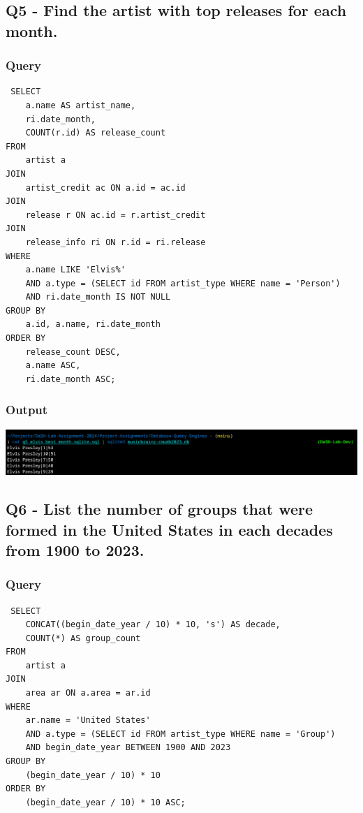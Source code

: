 \documentclass[11pt]{article}
\begin{document}
\subsection{Q5 - Find the artist with top releases for each month.}
\label{sec:org874fa3d}
\subsubsection{Query}
\label{sec:org431c081}
\begin{verbatim}
 SELECT
    a.name AS artist_name,
    ri.date_month,
    COUNT(r.id) AS release_count
FROM
    artist a
JOIN
    artist_credit ac ON a.id = ac.id
JOIN
    release r ON ac.id = r.artist_credit
JOIN
    release_info ri ON r.id = ri.release
WHERE
    a.name LIKE 'Elvis%'
    AND a.type = (SELECT id FROM artist_type WHERE name = 'Person')
    AND ri.date_month IS NOT NULL
GROUP BY
    a.id, a.name, ri.date_month
ORDER BY
    release_count DESC,
    a.name ASC,
    ri.date_month ASC;
\end{verbatim}
\subsubsection{Output}
\label{sec:orgec30ceb}
\begin{center}
\includegraphics[width=.9\linewidth]{./images/Q5.png}
\end{center}
\subsection{Q6 - List the number of groups that were formed in the United States in each decades from 1900 to 2023.}
\label{sec:org42b25e2}
\subsubsection{Query}
\label{sec:orga0217e8}
\begin{verbatim}
 SELECT
    CONCAT((begin_date_year / 10) * 10, 's') AS decade,
    COUNT(*) AS group_count
FROM
    artist a
JOIN
    area ar ON a.area = ar.id
WHERE
    ar.name = 'United States'
    AND a.type = (SELECT id FROM artist_type WHERE name = 'Group')
    AND begin_date_year BETWEEN 1900 AND 2023
GROUP BY
    (begin_date_year / 10) * 10
ORDER BY
    (begin_date_year / 10) * 10 ASC;
\end{verbatim}
\end{document}
